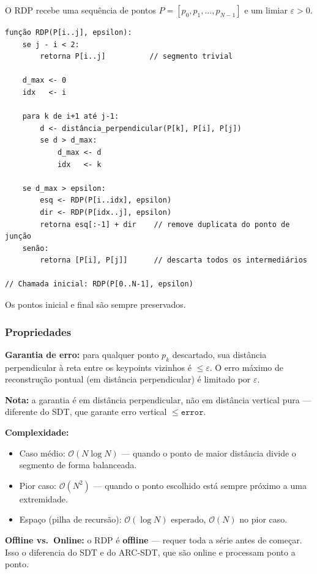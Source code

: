 \documentclass[12pt, a4paper]{article}
\begin{document}
O RDP recebe uma sequência de pontos $P = [p_0, p_1, \ldots, p_{N-1}]$ e um limiar $\varepsilon > 0$.

\begin{lstlisting}[caption={Pseudocódigo do RDP}]
função RDP(P[i..j], epsilon):
    se j - i < 2:
        retorna P[i..j]          // segmento trivial

    d_max <- 0
    idx   <- i

    para k de i+1 até j-1:
        d <- distância_perpendicular(P[k], P[i], P[j])
        se d > d_max:
            d_max <- d
            idx   <- k

    se d_max > epsilon:
        esq <- RDP(P[i..idx], epsilon)
        dir <- RDP(P[idx..j], epsilon)
        retorna esq[:-1] + dir    // remove duplicata do ponto de junção
    senão:
        retorna [P[i], P[j]]      // descarta todos os intermediários

// Chamada inicial: RDP(P[0..N-1], epsilon)
\end{lstlisting}

Os pontos inicial e final são sempre preservados.

\subsubsection{Propriedades}

\textbf{Garantia de erro:} para qualquer ponto $p_k$ descartado, sua distância perpendicular à reta entre os keypoints vizinhos é $\leq \varepsilon$. O erro máximo de reconstrução pontual (em distância perpendicular) é limitado por $\varepsilon$.

\textbf{Nota:} a garantia é em distância perpendicular, não em distância vertical pura — diferente do SDT, que garante erro vertical $\leq \mathtt{error}$.

\textbf{Complexidade:}
\begin{itemize}
    \item Caso médio: $\mathcal{O}(N \log N)$ — quando o ponto de maior distância divide o segmento de forma balanceada.
    \item Pior caso: $\mathcal{O}(N^2)$ — quando o ponto escolhido está sempre próximo a uma extremidade.
    \item Espaço (pilha de recursão): $\mathcal{O}(\log N)$ esperado, $\mathcal{O}(N)$ no pior caso.
\end{itemize}

\textbf{Offline vs.\ Online:} o RDP é \textbf{offline} — requer toda a série antes de começar. Isso o diferencia do SDT e do ARC-SDT, que são online e processam ponto a ponto.
\end{document}
